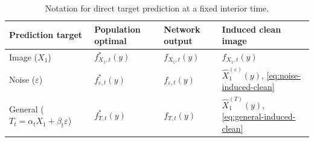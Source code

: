 \begin{table}[H]
\centering
\caption{Notation for direct target prediction at a fixed interior time.}
\label{tab:prediction-notation}
\begin{tabular}{llll}
\toprule
Prediction target & Population optimal & Network output & Induced clean image\\
\midrule
Image ($X_1$) & $f_{X_1,t}^{\ast}(y)$ & $f_{X_1,t}(y)$ & $f_{X_1,t}(y)$\\
Noise ($\varepsilon$) & $f_{\varepsilon,t}^{\ast}(y)$ & $f_{\varepsilon,t}(y)$ & $\widehat X_1^{(\varepsilon)}(y)$, \eqref{eq:noise-induced-clean}\\
General ($T_t=\alpha_tX_1+\beta_t\varepsilon$) & $f_{T,t}^{\ast}(y)$ & $f_{T,t}(y)$ & $\widehat X_1^{(T)}(y)$, \eqref{eq:general-induced-clean}\\
\bottomrule
\end{tabular}
\end{table}
